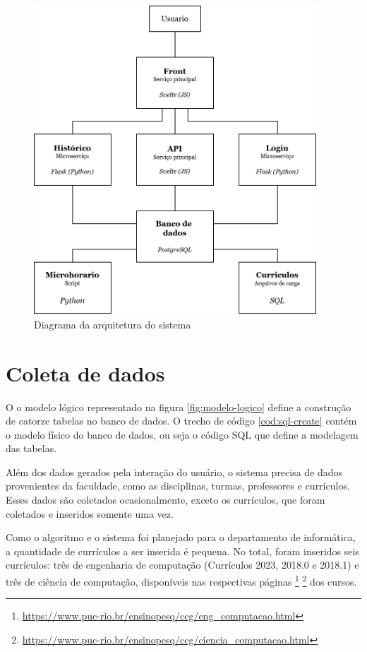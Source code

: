 \begin{figure}[ht]
    \begin{center}
    \includegraphics[width=300pt]{figuras/diagrama-arquitetura.png}
    \caption{Diagrama da arquitetura do sistema}
    \label{fig:diagrama-arquitetura}
    \end{center}
\end{figure}

\section{Coleta de dados}

O o modelo lógico representado na figura \ref{fig:modelo-logico} define a construção de catorze tabelas no banco de dados. O trecho de código \ref{cod:sql-create} contém o modelo físico do banco de dados, ou seja o código SQL que define a modelagem das tabelas.



Além dos dados gerados pela interação do usuário, o sistema precisa de dados provenientes da faculdade, como as disciplinas, turmas, professores e currículos. Esses dados são coletados ocasionalmente, exceto os currículos, que foram coletados e inseridos somente uma vez.

Como o algoritmo e o sistema foi planejado para o departamento de informática, a quantidade de currículos a ser inserida é pequena. No total, foram inseridos seis currículos: três de engenharia de computação (Currículos 2023, 2018.0 e 2018.1) e três de ciência de computação, disponíveis nas respectivas páginas
\footnote{\url{https://www.puc-rio.br/ensinopesq/ccg/eng_computacao.html}}
\footnote{\url{https://www.puc-rio.br/ensinopesq/ccg/ciencia_computacao.html}}
dos cursos.

